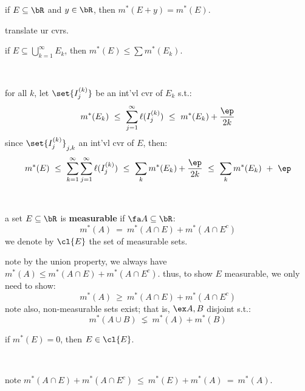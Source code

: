 \begin{lm}
	if $E\subseteq\bR$ and $y\in\bR$, then $m^{*}(E+y)=m^{*}(E)$.
\end{lm}
translate ur cvrs.

\begin{lm}
	if $E\subseteq\bigcup_{k=1}^{\infty}E_{k}$, then $m^{*}(E)\leq\sum m^{*}(E_{k})$.
\end{lm} \

\begin{pf}
	for all $k$, let $\set{I_{j}^{(k)}}$ be an int'vl cvr of $E_{k}$ s.t.:
	\begin{equation*}
		m^{*}(E_{k}) \ \leq \ \sum_{j=1}^{\infty}\ell(I_{j}^{(k)}) \ \leq \ m^{*}(E_{k})+\frac{\ep}{2k}
	\end{equation*}
	since $\set{I_{j}^{(k)}}_{j,k}$ an int'vl cvr of $E$, then:
	\begin{equation*}
		m^{*}(E) \ \leq \ \sum_{k=1}^{\infty}\sum_{j=1}^{\infty}\ell(I_{j}^{(k)})
		\ \leq \ \sum_{k}m^{*}(E_{k})+\frac{\ep}{2k}
		\ \leq \ \sum_{k}m^{*}(E_{k}) \ + \ \ep
	\end{equation*}
\end{pf} \

\begin{defn}
	a set $E\subseteq\bR$ is \textbf{measurable} if $\fa A\subseteq\bR$:
	\begin{equation*}
		m^{*}(A) \ = \ m^{*}(A\cap E) + m^{*}(A\cap E^{c})
	\end{equation*}
	we denote by $\cl{E}$ the set of measurable sets.
\end{defn}
note by the union property, we always have 
$m^{*}(A) \leq m^{*}(A\cap E) + m^{*}(A\cap E^{c})$.
thus, to show $E$ measurable, we only need to show:
\begin{equation*}
	m^{*}(A) \ \geq \ m^{*}(A\cap E) + m^{*}(A\cap E^{c})
\end{equation*}
note also, non-measurable sets exist; that is, $\ex A,B$ disjoint s.t.:
\begin{equation*}
	m^{*}(A\cup B) \ \lneq \ m^{*}(A) + m^{*}(B)
\end{equation*}

\begin{lm}
	if $m^{*}(E)=0$, then $E\in\cl{E}$.
\end{lm} \

\begin{pf}
	note
	$m^{*}(A\cap E)+m^{*}(A\cap E^{c}) \ \leq \ m^{*}(E)+m^{*}(A) \ = \ m^{*}(A)$.
\end{pf} \

